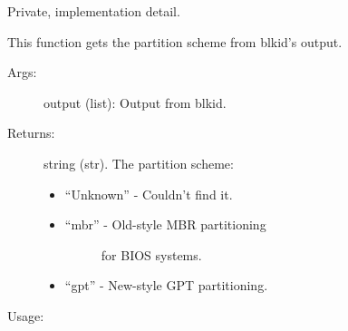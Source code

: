 \documentclass[letterpaper,10pt,english]{sphinxmanual}
\begin{document}
\begin{fulllineitems}
\label{\detokenize{cygwin:getdevinfo.cygwin.get_partitioning}}
Private, implementation detail.

This function gets the partition scheme from
blkid’s output.
\begin{description}
\item[{Args:}] \leavevmode
output (list):   Output from blkid.

\item[{Returns:}] \leavevmode
string (str). The partition scheme:
\begin{itemize}
\item {} 
“Unknown”     - Couldn’t find it.

\item {} \begin{description}
\item[{“mbr”         - Old-style MBR partitioning}] \leavevmode
for BIOS systems.

\end{description}

\item {} 
“gpt”         - New-style GPT partitioning.

\end{itemize}

\end{description}

Usage:

\begin{sphinxVerbatim}[commandchars=\\\{\}]
  
\end{sphinxVerbatim}

\end{fulllineitems}

\end{document}

